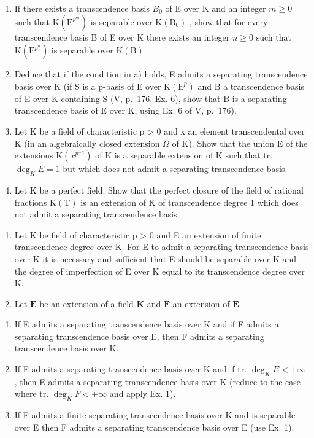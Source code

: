 \begin{enumerate}
\def\labelenumi{\alph{enumi})}
\item
  If there exists a transcendence basis \(B_{0}\) of E over K and an integer \(m \geqslant 0\) such that \(\mathrm{K}(\mathrm{E}^{p^{m}})\) is separable over \(\mathrm{K}(\mathrm{B}_{0})\) , show that for every transcendence basis B of E over K there exists an integer \(n \geqslant 0\) such that \(\mathrm{K}(\mathrm{E}^{p^{n}})\) is separable over \(\mathrm{K}(\mathrm{B})\) .
\item
  Deduce that if the condition in a) holds, E admits a separating transcendence basis over K (if S is a p-basis of E over \(\mathrm{K}(\mathrm{E}^{p})\) and B a transcendence basis of E over K containing S (V, p.~176, Ex. 6), show that B is a separating transcendence basis of E over K, using Ex. 6 of V, p.~176).
\item
  Let K be a field of characteristic p \textgreater{} 0 and x an element transcendental over K (in an algebraically closed extension \(\Omega\) of K). Show that the union E of the extensions \(\mathrm{K}(x^{p^{-n}})\) of K is a separable extension of K such that tr. \(\deg_{K}E = 1\) but which does not admit a separating transcendence basis.
\item
  Let K be a perfect field. Show that the perfect closure of the field of rational fractions \(\mathrm{K}(\mathrm{T})\) is an extension of K of transcendence degree 1 which does not admit a separating transcendence basis.
\end{enumerate}

\begin{enumerate}
\def\labelenumi{\arabic{enumi})}
\setcounter{enumi}{1}
\item
  Let K be field of characteristic p \textgreater{} 0 and E an extension of finite transcendence degree over K. For E to admit a separating transcendence basis over K it is necessary and sufficient that E should be separable over K and the degree of imperfection of E over K equal to its transcendence degree over K.
\item
  Let \(\mathbf{E}\) be an extension of a field \(\mathbf{K}\) and \(\mathbf{F}\) an extension of \(\mathbf{E}\) .
\end{enumerate}

\begin{enumerate}
\def\labelenumi{\alph{enumi})}
\item
  If E admits a separating transcendence basis over K and if F admits a separating transcendence basis over E, then F admits a separating transcendence basis over K.
\item
  If F admits a separating transcendence basis over K and if tr. \(\deg_{K}E<+\infty\) , then E admits a separating transcendence basis over K (reduce to the case where tr. \(\deg_{K}F<+\infty\) and apply Ex. 1).
\item
  If F admits a finite separating transcendence basis over K and is separable over E then F admits a separating transcendence basis over E (use Ex. 1).
\end{enumerate}


